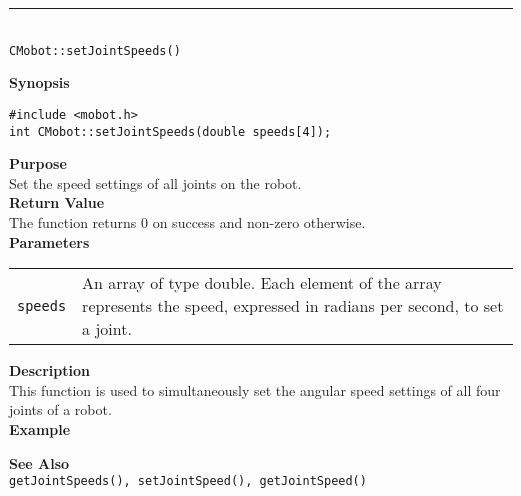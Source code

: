\noindent
\vspace{5pt}
\rule{4.5in}{0.015in}\\
\noindent
{\LARGE \texttt{CMobot::setJointSpeeds()}}\\
{}

\noindent
{\bf Synopsis}\\
\begin{verbatim}
#include <mobot.h>
int CMobot::setJointSpeeds(double speeds[4]);
\end{verbatim}

\noindent
{\bf Purpose}\\
Set the speed settings of all joints on the robot.\\

\noindent
{\bf Return Value}\\
The function returns 0 on success and non-zero otherwise.\\

\noindent
{\bf Parameters}
\vspace{-0.1in}
\begin{description}
\item               
\begin{tabular}{p{10 mm}p{145 mm}}
\texttt{speeds} & An array of type double. Each element of the array
represents the speed, expressed in radians per second, to set a joint. \\
\end{tabular}
\end{description}

\noindent
{\bf Description}\\
This function is used to simultaneously set the angular speed settings of
all four joints of a robot. \\

\noindent
{\bf Example}\\
\noindent

\noindent
{\bf See Also}\\
\texttt{getJointSpeeds(), setJointSpeed(), getJointSpeed()}

